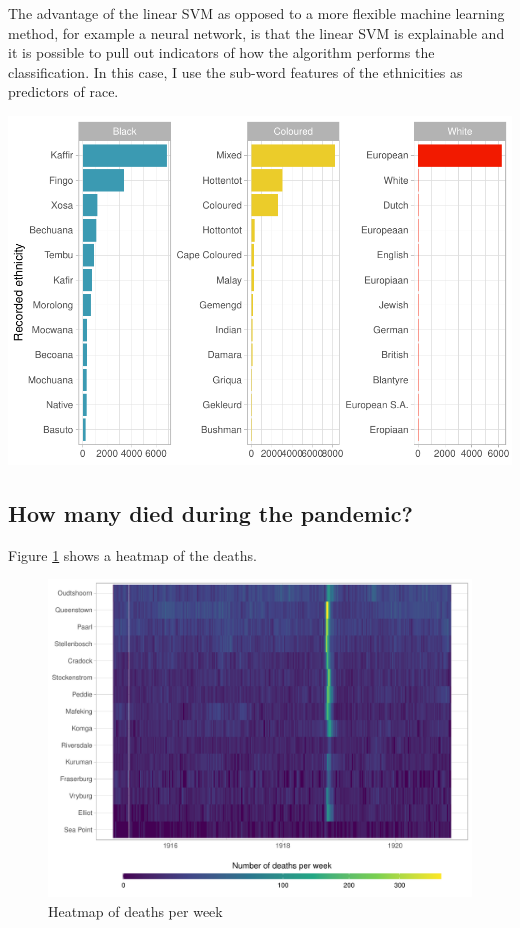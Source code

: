 \documentclass[fleqn,10pt,lineno]{wlpeerj} %
\begin{document}
The advantage of the linear SVM as opposed to a more flexible machine learning method, for example a neural network, is that the linear SVM is explainable and it is possible to pull out indicators of how the algorithm performs the classification. In this case, I use the sub-word features of the ethnicities as predictors of race.

\includegraphics{spanish-flu-mortality_bookdown_files/figure-latex/unnamed-chunk-3-1.pdf}

\hypertarget{how-many-died-during-the-pandemic}{%
\subsection{How many died during the pandemic?}\label{how-many-died-during-the-pandemic}}

Figure \ref{fig:viridis-deaths} shows a heatmap of the deaths.

\begin{figure}
\centering
\includegraphics{spanish-flu-mortality_bookdown_files/figure-latex/viridis-deaths-1.pdf}
\caption{\label{fig:viridis-deaths}Heatmap of deaths per week}
\end{figure}
\end{document}
